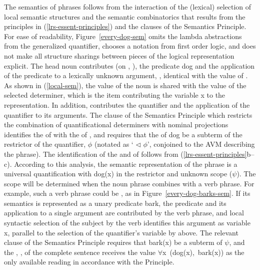 \documentclass[output=paper
 	        ,biblatex
                ,babelshorthands
                ,newtxmath
                ,draftmode
                ,colorlinks, citecolor=brown
]{langscibook}
\begin{document}
The semantics of phrases follows from the interaction of the (lexical) selection of local semantic structures and the semantic combinatorics that results from the principles in (\ref{lrs-essent-principles}) and the clauses of the Semantics Principle.
For ease of readability, Figure~\ref{every-dog-sem} omits the lambda abstractions from the generalized quantifier, chooses a notation from first order logic, and does not make all structure sharings between pieces of the logical representation explicit. The head noun  contributes (on , ), the predicate {\normalfont \sffamily dog} and the application of the predicate to a lexically unknown argument, , identical with the  value of . As shown in (\ref{local-sem}), the  value of the noun is shared with the  value of the selected determiner, which is the item contributing the variable {\normalfont \sffamily x} to the representation. In addition,  contributes the quantifier and the application of the quantifier to its arguments. The clause of the Semantics Principle which restricts the combination of quantificational determiners with nominal projections identifies the  of  with the  of , and requires that the  of dog  be a subterm of the restrictor of the quantifier, $\phi$ (notated as ` $\triangleleft$ $\phi$', conjoined to the AVM describing the phrase). The identification of the  and  of  follows from (\ref{lrs-essent-principles}b--c). According to this analysis, the semantic representation of the phrase  is a universal quantification with {\normalfont \sffamily dog(x)} in the restrictor and unknown scope ($\psi$). The scope will be determined when the noun phrase combines with a verb phrase. For example, such a verb phrase could be , as in  Figure~\ref{every-dog-barks-sem}. If its semantics is represented as a unary predicate {\normalfont \sffamily bark}, the predicate and its application to a single argument are contributed by the verb phrase, and local syntactic selection of the subject  by the verb  identifies this argument as variable {\normalfont \sffamily x}, parallel to the selection of the quantifier's variable by  above. The relevant clause of the Semantics Principle requires that {\normalfont \sffamily bark(x)} be a subterm of $\psi$, and the , , of the complete sentence receives the value \mbox{\normalfont \sffamily $\forall$x (dog(x), bark(x))} as the only available reading in accordance with the  Principle. %
\end{document}
